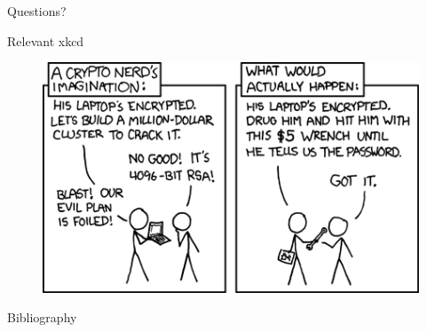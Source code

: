 \documentclass[handout, aspectratio=169]{beamer}
\begin{document}
\begin{frame}{}
      \begin{center}
    {\color{sigma@mainblue} \LARGE Questions?}
  \end{center}
\end{frame}

\begin{frame}{Relevant xkcd}
  \begin{figure}
      \centering
      \includegraphics[scale=0.65]{xkcd_rsa.png}
  \end{figure}
\end{frame}

\begin{frame}{Bibliography}
    \nocite{Wong}
    \nocite{Shor}
    
    
\end{frame}
\end{document}
